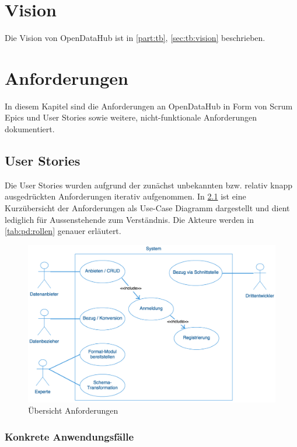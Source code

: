 \chapter{Vision}
Die Vision von OpenDataHub ist in \cref{part:tb}, \vref{sec:tb:vision} beschrieben.


\chapter{Anforderungen}
In diesem Kapitel sind die Anforderungen an OpenDataHub in Form von Scrum Epics und User Stories sowie weitere, nicht-funktionale Anforderungen dokumentiert.


\section{User Stories}\label{sec:pd:user-stories}

Die User Stories wurden aufgrund der zunächst unbekannten bzw. relativ knapp ausgedrückten Anforderungen iterativ aufgenommen. In \cref{fig:pd:uc-diagramm} ist eine Kurzübersicht der Anforderungen als Use-Case Diagramm dargestellt und dient lediglich für Aussenstehende zum Verständnis. Die Akteure werden in \cref{tab:pd:rollen} genauer erläutert.

\begin{figure}[H]
	\centering
	\includegraphics[width=0.9\linewidth]{fig/uc-diagramm}
	\caption{Übersicht Anforderungen}
	\label{fig:pd:uc-diagramm}
\end{figure}

\subsection{Konkrete Anwendungsfälle}
\label{sec:pd:usecases}

